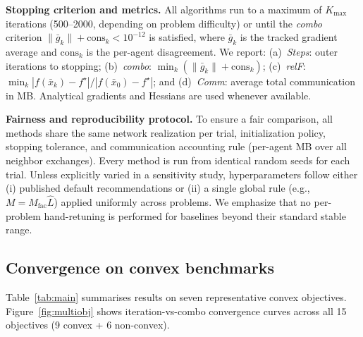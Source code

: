 \documentclass[11pt,a4paper]{article}
\begin{document}
	\noindent\textbf{Stopping criterion and metrics.}
	All algorithms run to a maximum of $K_{\max}$ iterations (500--2000, depending on problem
	difficulty) or until the \emph{combo} criterion $\|\bar g_k\|+\mathrm{cons}_k < 10^{-12}$
	is satisfied, where $\bar g_k$ is the tracked gradient average and $\mathrm{cons}_k$ is the
	per-agent disagreement.
	We report: (a)~\emph{Steps}: outer iterations to stopping;
	(b)~\emph{combo}: $\min_k(\|\bar g_k\|+\mathrm{cons}_k)$;
	(c)~\emph{relF}: $\min_k |f(\bar x_k)-f^\star|/|f(\bar x_0)-f^\star|$; and
	(d)~\emph{Comm}: average total communication in MB.
	Analytical gradients and Hessians are used whenever available.

	\noindent\textbf{Fairness and reproducibility protocol.}
	To ensure a fair comparison, all methods share the same network realization per trial,
	initialization policy, stopping tolerance, and communication accounting rule
	(per-agent MB over all neighbor exchanges).
	Every method is run from identical random seeds for each trial.
	Unless explicitly varied in a sensitivity study, hyperparameters follow either
	(i) published default recommendations or (ii) a single global rule (e.g., $M=M_{\mathrm{fac}}\hat L$)
	applied uniformly across problems.
	We emphasize that no per-problem hand-retuning is performed for baselines beyond
	their standard stable range.
	
	\subsection{Convergence on convex benchmarks}\label{ssec:convex}
	
	Table~\ref{tab:main} summarises results on seven representative convex objectives.
	Figure~\ref{fig:multiobj} shows iteration-vs-combo convergence curves across
	all 15 objectives (9 convex + 6 non-convex).
	
\end{document}
